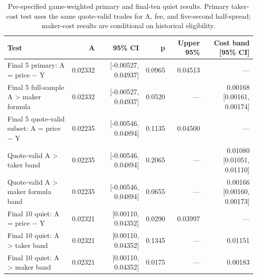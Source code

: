 \begin{table}[!htbp]
\centering
\small
\caption{Pre-specified game-weighted primary and final-ten quiet results. Primary taker-cost test uses the same quote-valid trades for A, fee, and five-second half-spread; maker-cost results are conditional on historical eligibility.}
\label{tab:primary-bands}
\begin{tabular}{lrrrrr}
\toprule
Test & A & 95\% CI & p & Upper 95\% & Cost band [95\% CI] \\
\midrule
Final 5 primary: A = price − Y & 0.02332 & [-0.00527, 0.04937] & 0.0965 & 0.04513 & — \\
Final 5 full-sample A > maker formula & 0.02332 & [-0.00527, 0.04937] & 0.0520 & — & 0.00168 [0.00161, 0.00174] \\
Final 5 quote-valid subset: A = price − Y & 0.02235 & [-0.00546, 0.04894] & 0.1135 & 0.04500 & — \\
Quote-valid A > taker band & 0.02235 & [-0.00546, 0.04894] & 0.2065 & — & 0.01080 [0.01051, 0.01110] \\
Quote-valid A > maker formula band & 0.02235 & [-0.00546, 0.04894] & 0.0655 & — & 0.00166 [0.00160, 0.00173] \\
Final 10 quiet: A = price − Y & 0.02321 & [0.00110, 0.04352] & 0.0290 & 0.03997 & — \\
Final 10 quiet: A > taker band & 0.02321 & [0.00110, 0.04352] & 0.1345 & — & 0.01151 \\
Final 10 quiet: A > maker band & 0.02321 & [0.00110, 0.04352] & 0.0175 & — & 0.00183 \\
\bottomrule
\end{tabular}
\end{table}
